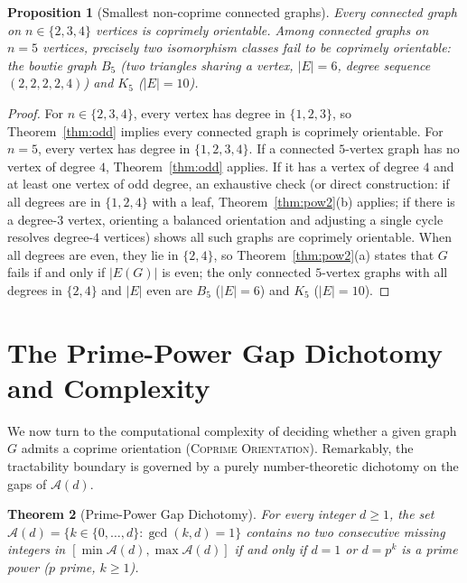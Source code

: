 \documentclass[11pt,a4paper]{article}
\newtheorem{theorem}{Theorem}[section]
\newtheorem{proposition}[theorem]{Proposition}
\theoremstyle{definition}
\theoremstyle{remark}
\newcommand{\Aset}{\mathcal{A}}
\begin{document}
\begin{proposition}[Smallest non-coprime connected graphs]\label{prop:smallest}
Every connected graph on $n \in \{2, 3, 4\}$ vertices is coprimely orientable. Among connected graphs on $n = 5$ vertices, precisely two isomorphism classes fail to be coprimely orientable: the bowtie graph $B_5$ (two triangles sharing a vertex, $|E| = 6$, degree sequence $(2,2,2,2,4)$) and $K_5$ ($|E| = 10$).
\end{proposition}

\begin{proof}
For $n \in \{2, 3, 4\}$, every vertex has degree in $\{1, 2, 3\}$, so Theorem~\ref{thm:odd} implies every connected graph is coprimely orientable. For $n = 5$, every vertex has degree in $\{1, 2, 3, 4\}$. If a connected $5$-vertex graph has no vertex of degree $4$, Theorem~\ref{thm:odd} applies. If it has a vertex of degree $4$ and at least one vertex of odd degree, an exhaustive check (or direct construction: if all degrees are in $\{1, 2, 4\}$ with a leaf, Theorem~\ref{thm:pow2}(b) applies; if there is a degree-$3$ vertex, orienting a balanced orientation and adjusting a single cycle resolves degree-$4$ vertices) shows all such graphs are coprimely orientable. When all degrees are even, they lie in $\{2, 4\}$, so Theorem~\ref{thm:pow2}(a) states that $G$ fails if and only if $|E(G)|$ is even; the only connected $5$-vertex graphs with all degrees in $\{2, 4\}$ and $|E|$ even are $B_5$ ($|E| = 6$) and $K_5$ ($|E| = 10$).
\end{proof}

\section{The Prime-Power Gap Dichotomy and Complexity}

We now turn to the computational complexity of deciding whether a given graph $G$ admits a coprime orientation (\textsc{Coprime Orientation}). Remarkably, the tractability boundary is governed by a purely number-theoretic dichotomy on the gaps of $\Aset(d)$.

\begin{theorem}[Prime-Power Gap Dichotomy]\label{thm:gap}
For every integer $d \ge 1$, the set $\Aset(d) = \{k \in \{0, \dots, d\} : \gcd(k, d) = 1\}$ contains no two consecutive missing integers in $[\min \Aset(d), \max \Aset(d)]$ if and only if $d = 1$ or $d = p^k$ is a prime power ($p$ prime, $k \ge 1$).
\end{theorem}
\end{document}
